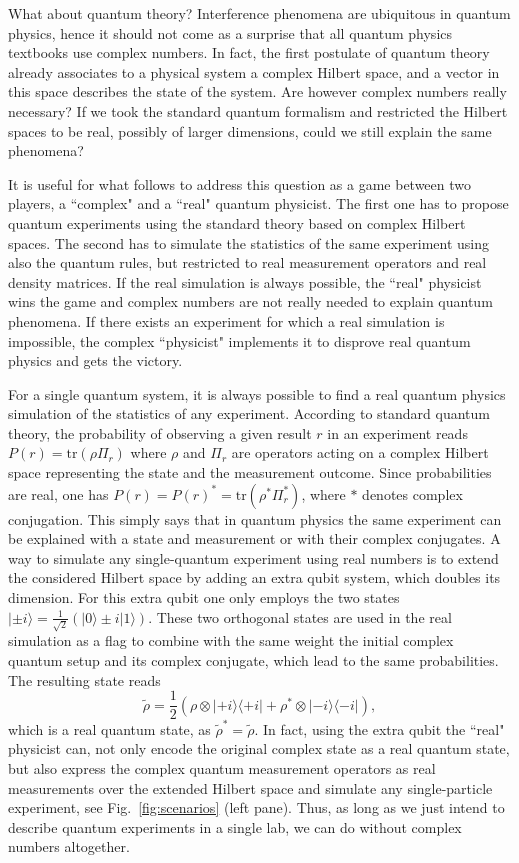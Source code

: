 \documentclass[onecolumn,prx,amsmath,amssymb]{revtex4-2}
\def\bra#1{\langle#1|} \def\ket#1{|#1\rangle}
\def\proj#1{\ket{#1}\!\bra{#1}}
\def\tr{\mbox{tr}}
\begin{document}
What about quantum theory? Interference phenomena are ubiquitous in quantum physics, hence it should not come as a surprise that all quantum physics textbooks use complex numbers. In fact, the first postulate of quantum theory already associates to a physical system a complex Hilbert space, and a vector in this space describes the state of the system. Are however complex numbers really necessary? If we took the standard quantum formalism and restricted the Hilbert spaces to be real, possibly of larger dimensions, could we still explain the same phenomena?


It is useful for what follows to address this question as a game between two players, a ``complex" and a ``real" quantum physicist. The first one has to propose quantum experiments using the standard theory based on complex Hilbert spaces. The second has to simulate the statistics of the same experiment using also the quantum rules, but restricted to real measurement operators and real density matrices. If the real simulation is always possible, the ``real" physicist wins the game and complex numbers are not really needed to explain quantum phenomena. If there exists an experiment for which a real simulation is impossible, the complex ``physicist" implements it to disprove real quantum physics and gets the victory.

For a single quantum system, it is always possible to find a real quantum physics simulation of the statistics of any experiment. According to standard quantum theory, the probability of observing a given result $r$ in an experiment reads $P(r)=\tr(\rho \Pi_r)$ where $\rho$ and $\Pi_r$ are operators acting on a complex Hilbert space representing the state and the measurement outcome. Since probabilities are real, one has $P(r)=P(r)^*=\tr(\rho^* \Pi^*_r)$, where $*$ denotes complex conjugation. This simply says that in quantum physics the same experiment can be explained with a state and measurement or with their complex conjugates. A way to simulate any single-quantum experiment using real numbers is to extend the considered Hilbert space by adding an extra qubit system, which doubles its dimension. For this extra qubit one only employs the two states $\ket{\pm i}=\frac{1}{\sqrt{2}}(\ket{0}\pm i\ket{1})$. These two orthogonal states are used in the real simulation as a flag to combine with the same weight the initial complex quantum setup and its complex conjugate, which lead to the same probabilities. The resulting state reads 
\begin{equation}
\label{eq:realstate}
\tilde{\rho} = \frac{1}{2}(\rho\otimes\proj{+i} + \rho^*\otimes\proj{-i}) ,
\end{equation}
which is a real quantum state, as $\tilde{\rho}^*=\tilde{\rho}$. In fact, using the extra qubit the ``real" physicist can, not only encode the original complex state as a real quantum state, but also express the complex quantum measurement operators as real measurements over the extended Hilbert space and simulate any single-particle experiment, see Fig.~\ref{fig:scenarios} (left pane). Thus, as long as we just intend to describe quantum experiments in a single lab, we can do without complex numbers altogether.
\end{document}
